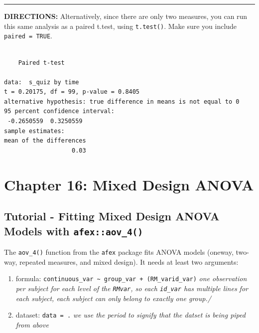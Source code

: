 \documentclass[]{article}
\newenvironment{Shaded}{\begin{snugshade}}{\end{snugshade}}
\newcommand{\KeywordTok}[1]{\textcolor[rgb]{0.13,0.29,0.53}{\textbf{#1}}}
\newcommand{\DataTypeTok}[1]{\textcolor[rgb]{0.13,0.29,0.53}{#1}}
\newcommand{\StringTok}[1]{\textcolor[rgb]{0.31,0.60,0.02}{#1}}
\newcommand{\CommentTok}[1]{\textcolor[rgb]{0.56,0.35,0.01}{\textit{#1}}}
\newcommand{\OtherTok}[1]{\textcolor[rgb]{0.56,0.35,0.01}{#1}}
\newcommand{\OperatorTok}[1]{\textcolor[rgb]{0.81,0.36,0.00}{\textbf{#1}}}
\newcommand{\NormalTok}[1]{#1}
\begin{document}
\begin{center}\rule{0.5\linewidth}{\linethickness}\end{center}

\textbf{DIRECTIONS:} Alternatively, since there are only two measures,
you can run this same analysis as a paired t.test, using
\texttt{t.test()}. Make sure you include \texttt{paired\ =\ TRUE}.

\begin{Shaded}
\end{Shaded}

\begin{verbatim}

    Paired t-test

data:  s_quiz by time
t = 0.20175, df = 99, p-value = 0.8405
alternative hypothesis: true difference in means is not equal to 0
95 percent confidence interval:
 -0.2650559  0.3250559
sample estimates:
mean of the differences 
                   0.03 
\end{verbatim}

\clearpage

\section{Chapter 16: Mixed Design
ANOVA}\label{chapter-16-mixed-design-anova}

\subsection{\texorpdfstring{Tutorial - Fitting Mixed Design ANOVA Models
with
\texttt{afex::aov\_4()}}{Tutorial - Fitting Mixed Design ANOVA Models with afex::aov\_4()}}\label{tutorial---fitting-mixed-design-anova-models-with-afexaov_4}

The \texttt{aov\_4()} function from the \texttt{afex} package fits ANOVA
models (oneway, two-way, repeated measures, and mixed design). It needs
at least two arguments:

\begin{enumerate}
\def\labelenumi{\arabic{enumi}.}
\item
  formula:
  \texttt{continuous\_var\ \textasciitilde{}\ group\_var\ +\ (RM\_var\textbar{}id\_var)}
  \emph{one observation per subject for each level of the
  \texttt{RMvar}, so each \texttt{id\_var} has multiple lines for each
  subject, each subject can only belong to exactly one group./}
\item
  dataset: \texttt{data\ =\ .} \emph{we use the period to signify that
  the datset is being piped from above}
\end{enumerate}
\end{document}
